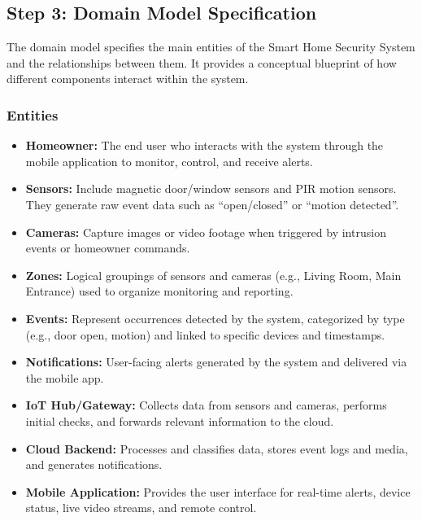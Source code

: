 \documentclass[conference]{IEEEtran}
\begin{document}
\subsection{Step 3: Domain Model Specification}
The domain model specifies the main entities of the Smart Home Security System and
the relationships between them. It provides a conceptual blueprint of how different
components interact within the system.

\subsubsection{Entities}
\begin{itemize}
    \item \textbf{Homeowner:} The end user who interacts with the system through the mobile application to monitor, control, and receive alerts.
    \item \textbf{Sensors:} Include magnetic door/window sensors and PIR motion sensors. They generate raw event data such as ``open/closed'' or ``motion detected''.
    \item \textbf{Cameras:} Capture images or video footage when triggered by intrusion events or homeowner commands.
    \item \textbf{Zones:} Logical groupings of sensors and cameras (e.g., Living Room, Main Entrance) used to organize monitoring and reporting.
    \item \textbf{Events:} Represent occurrences detected by the system, categorized by type (e.g., door open, motion) and linked to specific devices and timestamps.
    \item \textbf{Notifications:} User-facing alerts generated by the system and delivered via the mobile app.
    \item \textbf{IoT Hub/Gateway:} Collects data from sensors and cameras, performs initial checks, and forwards relevant information to the cloud.
    \item \textbf{Cloud Backend:} Processes and classifies data, stores event logs and media, and generates notifications.
    \item \textbf{Mobile Application:} Provides the user interface for real-time alerts, device status, live video streams, and remote control.
\end{itemize}
\end{document}
